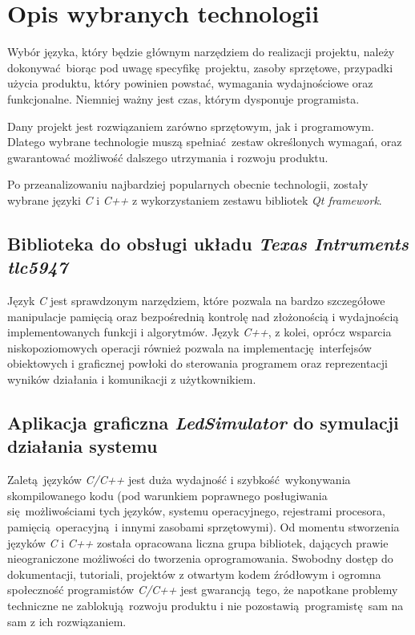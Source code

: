\documentclass[eng,printmode]{mgr}
\begin{document}

\chapter{Opis wybranych technologii}
\label{chap:technologies}

Wybór języka, który będzie głównym narzędziem do realizacji projektu, należy dokonywać biorąc pod uwagę specyfikę projektu, zasoby sprzętowe, przypadki użycia produktu, który powinien powstać, wymagania wydajnościowe oraz funkcjonalne. Niemniej ważny jest czas, którym dysponuje programista. 

Dany projekt jest rozwiązaniem zarówno sprzętowym, jak i programowym. Dlatego wybrane technologie muszą spełniać zestaw określonych wymagań, oraz gwarantować możliwość dalszego utrzymania i rozwoju produktu.

Po przeanalizowaniu najbardziej popularnych obecnie technologii, zostały wybrane języki \emph{C} i \emph{C++} z wykorzystaniem zestawu bibliotek \emph{Qt framework}.

\section{Biblioteka do obsługi układu \emph{Texas Intruments tlc5947}}
Język \emph{C} jest sprawdzonym narzędziem, które pozwala na bardzo szczegółowe manipulacje pamięcią oraz bezpośrednią kontrolę nad złożonością i wydajnością implementowanych funkcji i algorytmów. Język \emph{C++}, z kolei, oprócz wsparcia niskopoziomowych operacji również pozwala na implementację interfejsów obiektowych i graficznej powłoki do sterowania programem oraz reprezentacji wyników działania i komunikacji z użytkownikiem.


\section{Aplikacja graficzna \emph{LedSimulator} do symulacji działania systemu}
Zaletą języków \emph{C/C++} jest duża wydajność i szybkość wykonywania skompilowanego kodu (pod warunkiem poprawnego posługiwania się możliwościami tych języków, systemu operacyjnego, rejestrami procesora, pamięcią operacyjną i innymi zasobami sprzętowymi). Od momentu stworzenia języków \emph{C} i \emph{C++} została opracowana liczna grupa bibliotek, dających prawie nieograniczone możliwości do tworzenia oprogramowania. Swobodny dostęp do dokumentacji, tutoriali, projektów z otwartym kodem źródłowym i ogromna społeczność programistów \emph{C/C++} jest gwarancją tego, że napotkane problemy techniczne ne zablokują rozwoju produktu i nie pozostawią programistę sam na sam z ich rozwiązaniem.
\end{document}
